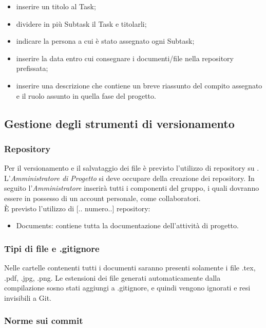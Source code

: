 \documentclass[./../NomeDocumento.tex]{subfiles}
\begin{document}
	\begin{itemize}
		\item inserire un titolo al Task;
		\item dividere in più Subtask il Task e titolarli;
		\item indicare la persona a cui è stato assegnato ogni Subtask;
		\item inserire la data entro cui consegnare i documenti/file nella repository prefissata;
		\item inserire una descrizione che contiene un breve riassunto del compito assegnato e il ruolo assunto in quella fase del progetto.
	\end{itemize}
	
	\subsection{Gestione degli strumenti di versionamento}
	
	\subsubsection{Repository}
	
	Per il versionamento e il salvataggio dei file è previsto l'utilizzo di repository su . L'\textit{Amministratore di Progetto} si deve occupare della creazione dei repository. In seguito l'\textit{Amministratore} inserirà tutti i componenti del gruppo, i quali dovranno essere in possesso di un account personale, come collaboratori.
	\\ \noindent È previsto l'utilizzo di [.. numero..] repository:
	
	\begin{itemize}	
		\item Documents: contiene tutta la documentazione dell'attività di progetto.
	\end{itemize}
	
	\subsubsection{Tipi di file e .gitignore}
	
	Nelle cartelle contenenti tutti i documenti saranno presenti solamente i file .tex, .pdf, .jpg, .png. Le estensioni dei file generati automaticamente dalla compilazione sosno stati aggiungi a .gitignore, e quindi vengono ignorati e resi invisibili a Git.
	
	\subsubsection{Norme sui commit}
	
\end{document}
